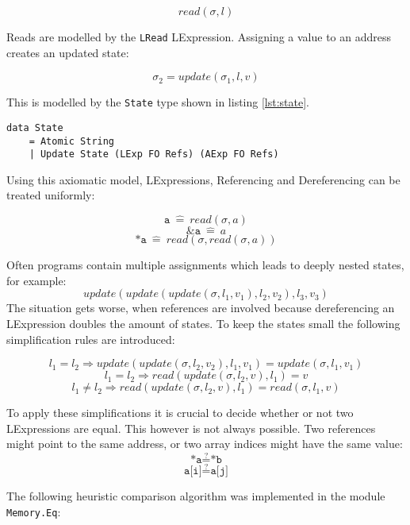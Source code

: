 \documentclass[12pt]{article}
\begin{document}
\[ read(\sigma, l) \]

Reads are modelled by the \texttt{LRead} LExpression.
Assigning a value to an address creates an updated state:

\[ \sigma_2 = update(\sigma_1, l, v) \]

This is modelled by the \texttt{State} type shown in listing \ref{lst:state}.

\begin{minipage}{\linewidth}
\begin{lstlisting}[style=c0, caption=State, label=lst:state]
data State
    = Atomic String
    | Update State (LExp FO Refs) (AExp FO Refs)
\end{lstlisting}
\end{minipage}

Using this axiomatic model, LExpressions, Referencing and Dereferencing can be treated uniformly:

\[ \texttt{a}\ \hat{=}\ read(\sigma, a) \]
\[ \texttt{\&a}\ \hat{=}\ a \]
\[ \texttt{*a}\ \hat{=}\ read(\sigma, read(\sigma, a))\]

Often programs contain multiple assignments which leads to deeply nested states, for example:
\[ update(update(update(\sigma, l_1, v_1), l_2, v_2), l_3, v_3) \]
The situation gets worse, when references are involved because dereferencing an LExpression doubles the amount of states. 
To keep the states small the following simplification rules are introduced:

\[ l_1 = l_2 \Rightarrow update(update(\sigma, l_2 , v_2), l_1, v_1) = update(\sigma, l_1 , v_1)\]
\[ l_1 = l_2 \Rightarrow read(update(\sigma, l_2 , v), l_1) = v \]
\[ l_1 \neq l_2 \Rightarrow read(update(\sigma, l_2 , v), l_1) = read(\sigma, l_1 , v) \]

To apply these simplifications it is crucial to decide whether or not two LExpressions are equal.
This however is not always possible.
Two references might point to the same address, or two array indices might have the same value:
\[ \texttt{*a} \stackrel{?}{=} \texttt{*b} \]
\[ \texttt{a[i]} \stackrel{?}{=} \texttt{a[j]} \]

The following heuristic comparison algorithm was implemented in the module \texttt{Memory.Eq}:
\end{document}
